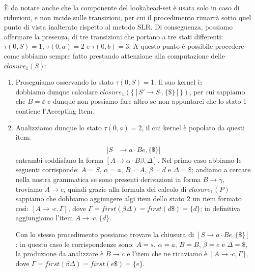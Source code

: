 \documentclass[class=book, crop=false, oneside, 12pt]{standalone}
\begin{document}
È da notare anche che la componente del lookahead-set è usata solo in caso di riduzioni, e non incide sulle transizioni, per cui il procedimento rimarrà sotto quel punto di vista inalterato rispetto al metodo SLR. Di conseguenza, possiamo affermare la presenza, di tre transizioni che portano a tre stati differenti: \(\tau(0,S)=1 \textrm{, } \tau(0,a)=2 \textrm{ e } \tau(0,b)=3\). A questo punto è possibile procedere come abbiamo sempre fatto prestando attenzione alla computazione delle \(closure_1(S)\):
\begin{enumerate}
    \item Proseguiamo osservando lo stato \(\tau(0, S)=\)1. Il suo kernel è:
    \begin{equation*}
        [S' \to S \cdot, \{\$\}]
    \end{equation*}
    dobbiamo dunque calcolare \(closure_1(\{[S' \to S \cdot, \{\$\}]\})\), per cui sappiamo che \(B = \varepsilon\) e dunque non possiamo fare altro se non appuntarci che lo stato 1 contiene l'Accepting Item.
    \item Analizziamo dunque lo stato \(\tau(0, a)=\)2, il cui kernel è popolato da questi item:
    \begin{align*}
        [S &\to a \cdot Ad, \{\$\}] \\
        [S &\to a \cdot Be, \{\$\}]
    \end{align*}
    entrambi soddisfano la forma \([A \rightarrow \alpha \cdot B \beta, \Delta]\).
    Nel primo caso abbiamo le seguenti corrisponde: \(A=S\), \(\alpha = a\), \(B = A\), \(\beta = d\) e \(\Delta=\$\); andiamo a cercare nella nostra grammatica se sono presenti derivazioni in forma \(B \to \gamma\), troviamo \(A \to c\), quindi grazie alla formula del calcolo di \(closure_1(P)\) sappiamo che dobbiamo aggiungere algi item dello stato 2 un item formato così: \([A \to \cdot c, {\Gamma}]\), dove \(\Gamma = first(\beta\Delta) = first(d\$) = \{d\}\); in definitiva aggiungiamo l'item \(A \to \cdot c, \{d\}\).

    Con lo stesso procedimento possiamo trovare la chiusura di \([S \to a \cdot Be, \{\$\}]\): in questo caso le corrispondenze sono: \(A=s\), \(\alpha=a\), \(B=B\), \(\beta=e\) e \(\Delta=\$\), la produzione da analizzare è \(B \to c\) e l'item che ne ricaviamo è \([A \to \cdot c, {\Gamma}]\), dove \(\Gamma = first(\beta\Delta) = first(e\$) = \{e\}\).
    

\end{enumerate}
\end{document}
